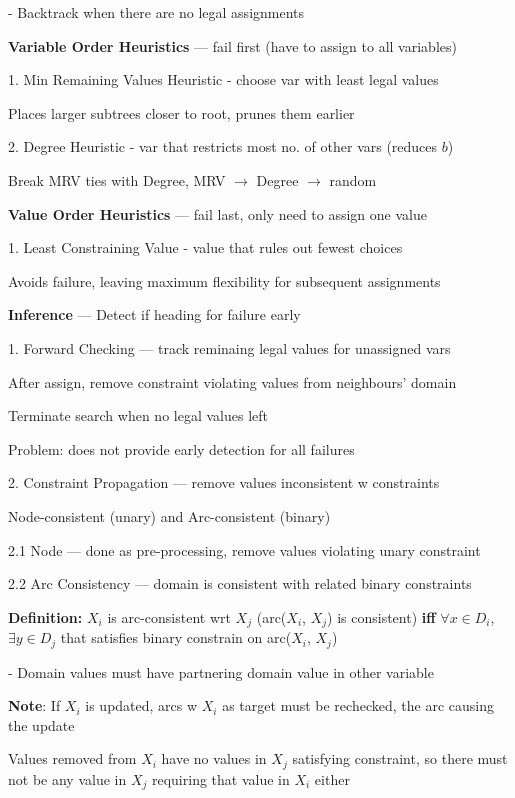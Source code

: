 \documentclass[10pt, a4paper]{article}
\newcommand{\highlight}[1]{{\color{red}\textbf{#1}}}
\newcommand{\blue}[1]{{\color{MidnightBlue}#1}}
\newcommand{\red}[1]{{\color{red}#1}}
\newcommand{\green}[1]{{\color{PineGreen}#1}}
\newcommand{\tab}[0]{\hspace*{2mm}}
\begin{document}
\begin{multicols*}{3}
		- Backtrack when there are no legal assignments

		\textbf{Variable Order Heuristics} --- fail first (have to assign to all variables)

		1. Min Remaining Values Heuristic - choose var with least legal values

		\tab{} Places \red{larger} subtrees closer to root, prunes them earlier

		2. Degree Heuristic - var that restricts most no. of other vars (reduces $b$)

		\tab{} Break MRV ties with Degree, MRV $\rightarrow$ Degree $\rightarrow$ random

		\textbf{Value Order Heuristics} --- fail last, only need to assign one value 

		1. Least Constraining Value - value that rules out fewest choices

		\tab{} Avoids failure, leaving maximum flexibility for subsequent assignments

		\textbf{Inference} --- Detect if heading for failure early

		1. Forward Checking --- track reminaing legal values for unassigned vars

		\tab{} After assign, remove constraint violating values from neighbours' domain

		\tab{} Terminate search when no legal values left

		\tab{} \red{Problem}: does \red{not} provide early detection for all failures

		2. Constraint Propagation --- remove values inconsistent w constraints

		\tab{} \green{Node-consistent} (unary) and \blue{Arc-consistent} (binary)

		2.1 Node --- done as pre-processing, remove values violating unary constraint

		2.2 Arc Consistency --- domain is consistent with related binary constraints

		\textbf{Definition:} $X_i$ is arc-consistent wrt $X_j$ (arc($X_i$, $X_j$) is consistent) \highlight{iff} 
		$\forall x \in D_i$, $\exists y \in D_j$ that satisfies binary constrain on arc($X_i$, $X_j$)

		\tab{} - Domain values \green{must have partnering domain value} in other variable

		\highlight{Note}: If $X_i$ is updated, arcs w $X_i$ as target \red{must be rechecked}, the arc causing the update

		Values removed from $X_i$ have no values in $X_j$ satisfying constraint, so there must not be any value in $X_j$ requiring that value in $X_i$ either


\end{multicols*}
\end{document}
